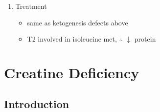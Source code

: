 \documentclass{scrartcl}
\begin{document}
\begin{enumerate}
\item Treatment
\label{sec:org862a015}
\begin{itemize}
\item same as ketogenesis defects above
\item T2 involved in isoleucine met, \(\therefore\) \(\downarrow\) protein
\end{itemize}
\end{enumerate}
\section{Creatine Deficiency}
\label{sec:org9632a1d}
\subsection{Introduction}
\label{sec:org40dc755}
\end{document}

